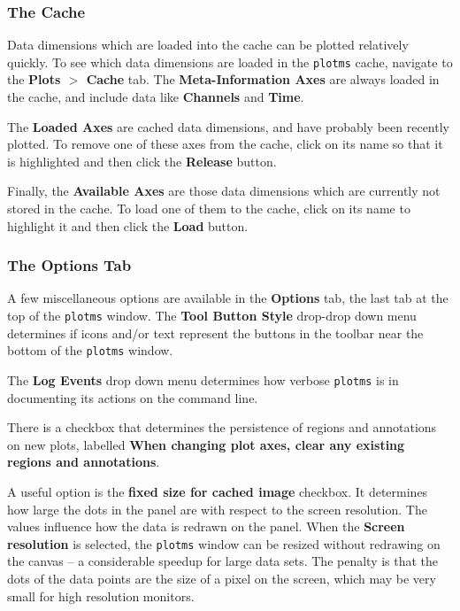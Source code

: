 \subsubsection{The Cache}
\label{section:edit.plot.plotms.cache}

Data dimensions which are loaded into the cache can be plotted relatively quickly. To see which data dimensions are loaded in the {\tt plotms} cache, navigate to the {\bf Plots $>$ Cache} tab. The {\bf Meta-Information Axes} are always loaded in the cache, and include data like {\bf Channels} and {\bf Time}. 

The {\bf Loaded Axes} are cached data dimensions, and have probably been recently plotted. To remove one of these axes from the cache, click on its name so that it is highlighted and then click the {\bf Release} button.

Finally, the {\bf Available Axes} are those data dimensions which are currently not stored in the cache. To load one of them to the cache, click on its name to highlight it and then click the {\bf Load} button.


\subsubsection{The Options Tab}
\label{section:edit.plot.plotms.options}

A few miscellaneous options are available in the {\bf Options} tab,
the last tab at the top of the {\tt plotms} window. 
 The {\bf Tool Button Style} drop-drop down menu determines if icons and/or text represent the buttons in the toolbar near the bottom of the {\tt plotms} window. 

The {\bf Log Events} drop down menu determines how verbose {\tt plotms} is in documenting its actions on the command line.

There is a checkbox that determines the persistence of regions and annotations on new plots, labelled {\bf When changing plot axes, clear any existing regions and annotations}.

A useful option is the {\bf fixed size for cached image}
checkbox. It determines how large the dots in the panel are with
respect to the screen resolution. The values influence how the data
is redrawn on the panel. When the {\bf Screen resolution} is selected,
the {\tt plotms} window can be resized without redrawing on
the canvas -- a considerable speedup for large data sets. The penalty is
that the dots of the data points are the size of a pixel on the
screen, which may be very small for high resolution monitors. 

